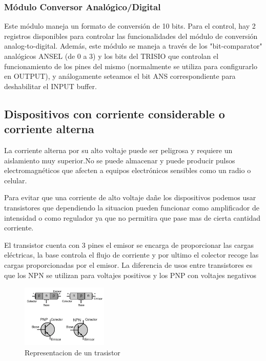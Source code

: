 \documentclass[a4paper]{article}
\begin{document}
\subsubsection*{Módulo Conversor Analógico/Digital}

Este módulo maneja un formato de conversión de 10 bits. Para el 
control, hay 2 registros disponibles para controlar las 
funcionalidades del módulo de conversión analog-to-digital. Además, 
este módulo se maneja a través de los "bit-comparator" analógicos
ANSEL (de 0 a 3) y los bits del TRISIO que controlan el 
funcionamiento de los pines del mismo (normalmente se utiliza para 
configurarlo en OUTPUT), y análogamente seteamos el bit ANS 
correspondiente para deshabilitar el INPUT buffer.

\subsection*{Dispositivos con corriente considerable o corriente alterna}

La corriente alterna por su alto voltaje puede ser peligrosa y requiere un 
aislamiento muy superior.No se puede almacenar y puede producir pulsos 
electromagnéticos que afecten a equipos electrónicos sensibles como un radio
 o celular.

Para evitar que una corriente de alto voltaje dañe los dispositivos podemos
usar transistores que dependiendo la situacion pueden funcionar como amplificador
de intensidad o como regulador ya que no permitira que pase mas de cierta cantidad
corriente.

El transistor cuenta con 3 pines el emisor se encarga de proporcionar las cargas 
eléctricas, la base controla el flujo de corriente y por ultimo el colector recoge
las cargas proporcionadas por el emisor. La diferencia de usos entre transistores 
es que los NPN se utilizan para voltajes positivos y los PNP con voltajes negativos

\begin{figure}[h]\centering
    \includegraphics[height=3cm]{transistorilustrado.png}
    \caption{Representacion de un trasistor}\label{fig:transistorilustrado}
\end{figure}
\end{document}

